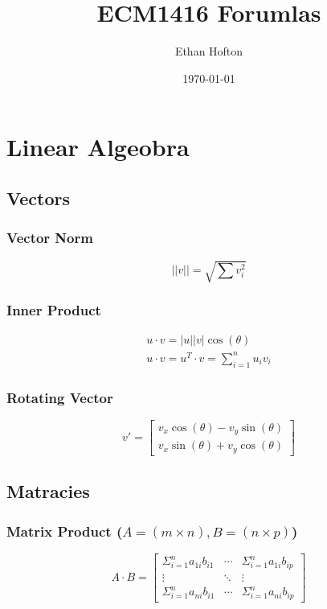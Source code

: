 \documentclass{article}
\title{ECM1416 Forumlas}
\author{Ethan Hofton}
\date{\today}
\begin{document}
    \maketitle

    \tableofcontents

    \section{Linear Algeobra}

        \subsection{Vectors}

        \subsubsection{Vector Norm}
        \begin{equation}
            ||v|| = \sqrt{\sum{v^2_i}}
        \end{equation}

        \subsubsection{Inner Product}
        \begin{gather}
            u \cdot v = |u||v|\cos(\theta) \\
            u \cdot v = u^T \cdot v = \sum^{n}_{i=1}{u_iv_i}
        \end{gather}

        \subsubsection{Rotating Vector}
        \begin{equation}
            v' = \begin{bmatrix} v_x \cos(\theta) - v_y \sin(\theta) \\ v_x \sin(\theta) + v_y \cos(\theta) \end{bmatrix}
        \end{equation}

        \subsection{Matracies}

        \subsubsection{Matrix Product ($ A=(m \times n), B=(n \times p) $)}
        \begin{equation}
            A \cdot B = \begin{bmatrix} \Sigma^n_{i=1}{a_{1i}b_{i1}} & \cdots & \Sigma^n_{i=1}{a_{1i}b_{ip}} \\
            \vdots & \ddots & \vdots \\ 
            \Sigma^n_{i=1}{a_{ni}b_{i1}} & \cdots & \Sigma^n_{i=1}{a_{ni}b_{ip}} \end{bmatrix}
        \end{equation}
\end{document}
